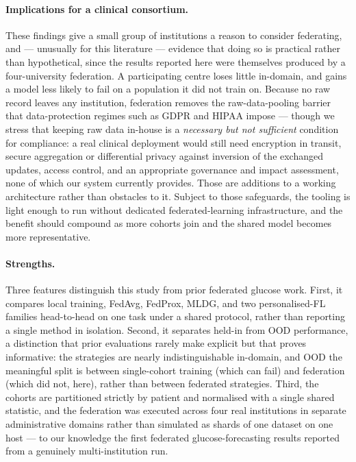 \documentclass[10pt,letterpaper]{article}
\begin{document}
\paragraph{Implications for a clinical consortium.} These findings give a small
group of institutions a reason to consider federating, and --- unusually for this
literature --- evidence that doing so is practical rather than hypothetical, since
the results reported here were themselves produced by a four-university
federation. A participating centre loses little in-domain, and gains a model less
likely to fail on a population it did not train on. Because no raw record leaves
any institution, federation removes the raw-data-pooling barrier that
data-protection regimes such as GDPR and HIPAA impose --- though we stress that
keeping raw data in-house is a \emph{necessary but not sufficient} condition for
compliance: a real clinical deployment would still need encryption in transit,
secure aggregation or differential privacy against inversion of the exchanged
updates, access control, and an appropriate governance and impact assessment, none
of which our system currently provides. Those are additions to a working
architecture rather than obstacles to it. Subject to those safeguards, the tooling
is light enough to run without dedicated federated-learning infrastructure, and
the benefit should compound as more cohorts join and the shared model becomes
more representative.

\paragraph{Strengths.} Three features distinguish this study from prior federated
glucose work. First, it compares local training, FedAvg, FedProx, MLDG, and two
personalised-FL families head-to-head on one task under a shared protocol, rather
than reporting a single method in isolation. Second, it separates held-in from
OOD performance, a distinction that prior evaluations rarely make explicit but
that proves informative: the strategies are nearly indistinguishable in-domain,
and OOD the meaningful split is between single-cohort training (which can fail)
and federation (which did not, here), rather than between federated strategies.
Third, the cohorts are partitioned strictly by patient and normalised with a
single shared statistic, and the federation was executed across four real
institutions in separate administrative domains rather than simulated as shards of
one dataset on one host --- to our knowledge the first federated glucose-forecasting
results reported from a genuinely multi-institution run.
\end{document}
